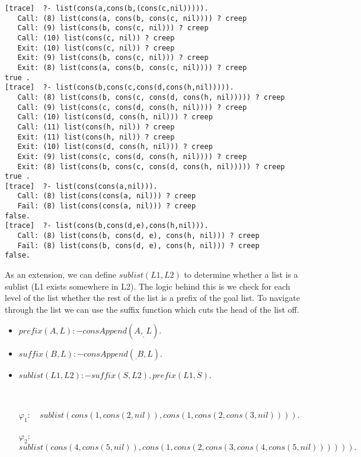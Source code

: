 \documentclass[fullpage]{article}
\begin{document}
\begin{verbatim}
[trace]  ?- list(cons(a,cons(b,(cons(c,nil))))).
   Call: (8) list(cons(a, cons(b, cons(c, nil)))) ? creep
   Call: (9) list(cons(b, cons(c, nil))) ? creep
   Call: (10) list(cons(c, nil)) ? creep
   Exit: (10) list(cons(c, nil)) ? creep
   Exit: (9) list(cons(b, cons(c, nil))) ? creep
   Exit: (8) list(cons(a, cons(b, cons(c, nil)))) ? creep
true .
[trace]  ?- list(cons(b,cons(c,cons(d,cons(h,nil))))).
   Call: (8) list(cons(b, cons(c, cons(d, cons(h, nil))))) ? creep
   Call: (9) list(cons(c, cons(d, cons(h, nil)))) ? creep
   Call: (10) list(cons(d, cons(h, nil))) ? creep
   Call: (11) list(cons(h, nil)) ? creep
   Exit: (11) list(cons(h, nil)) ? creep
   Exit: (10) list(cons(d, cons(h, nil))) ? creep
   Exit: (9) list(cons(c, cons(d, cons(h, nil)))) ? creep
   Exit: (8) list(cons(b, cons(c, cons(d, cons(h, nil))))) ? creep
true .
[trace]  ?- list(cons(cons(a,nil))).
   Call: (8) list(cons(cons(a, nil))) ? creep
   Fail: (8) list(cons(cons(a, nil))) ? creep
false.
[trace]  ?- list(cons(b,cons(d,e),cons(h,nil))).
   Call: (8) list(cons(b, cons(d, e), cons(h, nil))) ? creep
   Fail: (8) list(cons(b, cons(d, e), cons(h, nil))) ? creep
false.

\end{verbatim}
As an extension, we can define $sublist(L1,L2)$ to determine whether a list is a sublist (L1 exists somewhere in L2). The logic behind this is we check for each level of the list whether the rest of the list is a prefix of the goal list. To navigate through the list we can use the suffix function which cuts the head of the list off.
\begin{itemize}
\item {\em $prefix(A, L) :- consAppend(A, _, L).$}
\item {\em $suffix(B, L) :- consAppend(_, B, L).$}
\item {\em $sublist(L1, L2) :- suffix(S, L2), prefix(L1, S).$}
\end{itemize}
 \
\begin{itemize}
\item[$\varphi_1$:]~ $sublist(cons(1,cons(2,nil)), cons(1,cons(2,cons(3,nil)))).$
\item[$\varphi_2$:]~ $sublist(cons(4,cons(5,nil)),cons(1,cons(2,cons(3,cons(4,cons(5,nil)))))).$
\end{itemize}
 \
\end{document}
